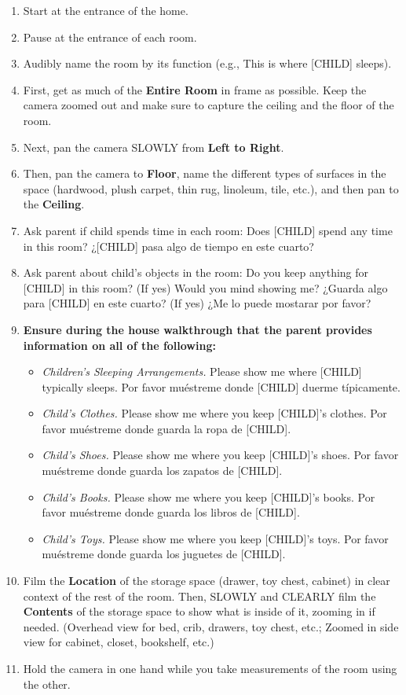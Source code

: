\documentclass[
]{book}
\providecommand{\tightlist}{%
  \setlength{\itemsep}{0pt}\setlength{\parskip}{0pt}}
\begin{document}
\begin{enumerate}
\def\labelenumi{\arabic{enumi}.}
\tightlist
\item
  Start at the entrance of the home.
\item
  Pause at the entrance of each room.
\item
  Audibly name the room by its function (e.g., This is where {[}CHILD{]} sleeps).
\item
  First, get as much of the \textbf{Entire Room} in frame as possible. Keep the camera zoomed out and make sure to capture the ceiling and the floor of the room.
\item
  Next, pan the camera SLOWLY from \textbf{Left to Right}.
\item
  Then, pan the camera to \textbf{Floor}, name the different types of surfaces in the space (hardwood, plush carpet, thin rug, linoleum, tile, etc.), and then pan to the \textbf{Ceiling}.
\item
  Ask parent if child spends time in each room: Does {[}CHILD{]} spend any time in this room? ¿{[}CHILD{]} pasa algo de tiempo en este cuarto?
\item
  Ask parent about child's objects in the room: Do you keep anything for {[}CHILD{]} in this room? (If yes) Would you mind showing me? ¿Guarda algo para {[}CHILD{]} en este cuarto? (If yes) ¿Me lo puede mostarar por favor?
\item
  \textbf{Ensure during the house walkthrough that the parent provides information on all of the following:}

  \begin{itemize}
  \tightlist
  \item
    \emph{Children's Sleeping Arrangements.} Please show me where {[}CHILD{]} typically sleeps. Por favor muéstreme donde {[}CHILD{]} duerme típicamente.
  \item
    \emph{Child's Clothes.} Please show me where you keep {[}CHILD{]}'s clothes. Por favor muéstreme donde guarda la ropa de {[}CHILD{]}.
  \item
    \emph{Child's Shoes.} Please show me where you keep {[}CHILD{]}'s shoes. Por favor muéstreme donde guarda los zapatos de {[}CHILD{]}.
  \item
    \emph{Child's Books.} Please show me where you keep {[}CHILD{]}'s books. Por favor muéstreme donde guarda los libros de {[}CHILD{]}.
  \item
    \emph{Child's Toys.} Please show me where you keep {[}CHILD{]}'s toys. Por favor muéstreme donde guarda los juguetes de {[}CHILD{]}.
  \end{itemize}
\item
  Film the \textbf{Location} of the storage space (drawer, toy chest, cabinet) in clear context of the rest of the room. Then, SLOWLY and CLEARLY film the \textbf{Contents} of the storage space to show what is inside of it, zooming in if needed. (Overhead view for bed, crib, drawers, toy chest, etc.; Zoomed in side view for cabinet, closet, bookshelf, etc.)
\item
  Hold the camera in one hand while you take measurements of the room using the other.


\end{enumerate}
\end{document}
